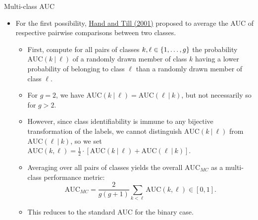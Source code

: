 \begin{vbframe}{Multi-class AUC}
\framebreak
  
\begin{itemize}  
  \small
  \item For the first possibility, 
  \href{https://link.springer.com/article/10.1023/A:1010920819831}
  {Hand and Till (2001)} proposed to average the AUC of respective pairwise 
  comparisons between two classes.
  \begin{itemize}
    \small
    \item First, compute for all pairs of classes $k, \ell \in \{1, \ldots, g\}$ the 
    probability $\text{AUC}(k ~|~ \ell)$ of a randomly drawn member of class $k$ 
    having a lower probability of belonging to class $\ell$ than a randomly drawn 
    member of class $\ell$.
    \item For $g = 2$, we have $\text{AUC}(k ~|~ \ell) = 
    \text{AUC}(\ell ~|~ k)$, but not necessarily so for $g > 2$.
    \item However, since class identifiability is immune to any bijective 
    transformation of the labels, we cannot distinguish $\text{AUC}(k ~|~ \ell)$ 
    from $\text{AUC}(\ell ~|~ k)$, so we set 
    $\text{AUC}(k, \ell) = \frac{1}{2} \cdot [\text{AUC}(k ~|~ \ell) + 
    \text{AUC}(\ell ~|~ k)]$.
  
  
    \item Averaging over all pairs of classes yields the overall 
    $\text{AUC}_{MC}$ as a multi-class performance metric:
    $$\text{AUC}_{MC} = \frac{2}{g(g + 1)} \sum_{k < \ell} \text{AUC}(k, \ell) 
    \in [0, 1].$$
    \item This reduces to the standard AUC for the binary case.
  \end{itemize}
\end{itemize}
\end{vbframe}


\endlecture

